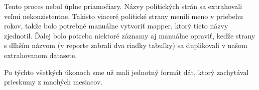 \documentclass[main.tex]{subfiles}
\begin{document}
Tento proces nebol úplne priamočiary. Názvy politických strán sa extrahovali veľmi nekonzistentne.
Takisto viaceré politické strany menili meno v priebehu rokov, takže bolo potrebné manuálne vytvoriť mapper, ktorý tieto názvy zjednotil. Ďalej bolo potreba niektoré záznamy aj manuálne opraviť, keďže strany s dlhším názvom (v reporte zabrali dva riadky tabuľky) sa duplikovali v našom extrahovanom datasete.

Po týchto všetkých úkonoch sme už mali jednotný formát dát, ktorý zachytával prieskumy z mnohých mesiacov.
\end{document}
